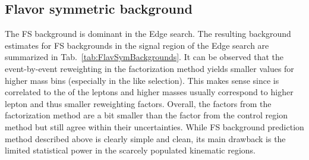 \subsection*{Flavor symmetric background}\label{sec:fsstrong}
\noindent
\justify
The FS background is dominant in the Edge search.
The resulting background estimates for FS backgrounds in the signal region of the Edge search are summarized in Tab.~\ref{tab:FlavSymBackgrounds}.
It can be observed that the event-by-event reweighting in the factorization method yields smaller \Rsfof values for higher mass bins (especially in the \ttbar like selection).
This makes sense since \mll is correlated to the \pt of the leptons and higher masses usually correspond to higher lepton \pt and thus smaller reweighting factors.
Overall, the \Rsfof factors from the factorization method are a bit smaller than the factor from the control region method but still agree within their uncertainties.
While FS background prediction method described above is clearly simple and clean, its main drawback is the limited statistical power in the scarcely populated kinematic regions.
